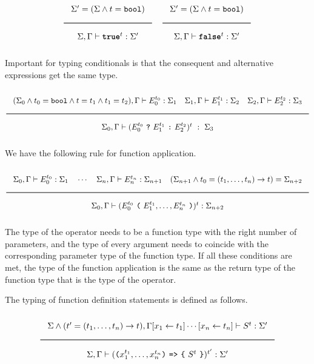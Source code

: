 \noindent
\[
  \Rule{\Sigma' = (\Sigma \wedge t = \Bool)}{\Sigma, \Gamma \vdash \TruE^t : \Sigma'}
  \quad
  \Rule{\Sigma' = (\Sigma \wedge t = \Bool)}{\Sigma, \Gamma \vdash \FalsE^t : \Sigma'}  
\]

\noindent
Important for typing conditionals is that the consequent and alternative
expressions get the same type. 

\noindent
\[
  \Rule{(\Sigma_0 \wedge t_0 = \Bool \wedge t = t_1 \wedge t_1 = t_2),
  \Gamma \vdash E_0^{t_0} : \Sigma_1 \quad
  \Sigma_1, \Gamma \vdash E_1^{t_1} : \Sigma_2 \quad
  \Sigma_2, \Gamma \vdash E_2^{t_2} : \Sigma_3 }{
  \Sigma_0, \Gamma \vdash ( E_0^{t_0}\ \texttt{?}\ E_1^{t_1}\ \texttt{:}\ E_2^{t_2})^t\ :\ \Sigma_3}  
\]

We have the following rule for function application.

\[
\Rule{  \Sigma_0, \Gamma \vdash E_0^{t_0} : \Sigma_1 \quad
	\cdots \quad \Sigma_{n}, \Gamma \vdash E_{n}^{t_n} : \Sigma_{n+1} \quad
	(\Sigma_{n+1} \wedge t_0 = (t_1, \ldots, t_n) \rightarrow t) = \Sigma_{n+2}}{
	\Sigma_0, \Gamma \vdash (E_0^{t_0}\ \Lp \ E_1^{t_1}, \ldots, E_n^{t_n}\ \Rp)^t : \Sigma_{n+2}}  
\]

\noindent
The type of the operator needs to be a function type with the right
number of parameters, and the type of every argument needs to coincide
with the corresponding parameter type of the function type. If all these
conditions are met, the type of the function application is the same
as the return type of the function type that is the type of the operator.

The typing of function definition statements is defined as follows.

\noindent
\[
  \Rule{\Sigma \wedge (t' = (t_1, \ldots, t_n) \rightarrow t), \Gamma[x_1 \leftarrow t_1]\cdots
    [x_n \leftarrow t_n]
    \vdash S^{t} : \Sigma'}{
    \Sigma, \Gamma \vdash ( \Lp  x_1^{t_1}, \ldots, x_n^{t_n} \Rp\ \texttt{=>}\ \Lc\ S^{t}\ \Rc)^{t'} : \Sigma'}  
\]





